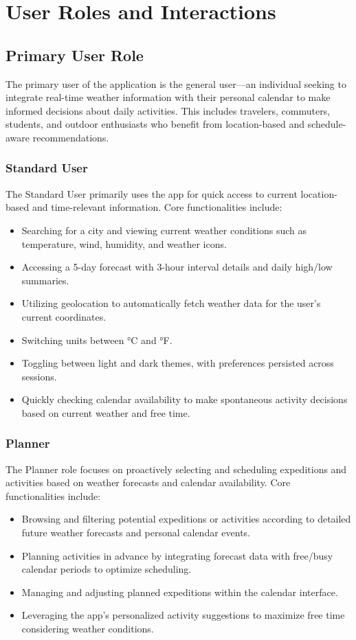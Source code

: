 \documentclass[fontsize=13pt,a4paper]{scrartcl}
\begin{document}
\newpage


\section{User Roles and Interactions}

\subsection{Primary User Role}
The primary user of the application is the general user—an individual seeking to integrate real-time weather information with their personal calendar to make informed decisions about daily activities. This includes travelers, commuters, students, and outdoor enthusiasts who benefit from location-based and schedule-aware recommendations.

\subsubsection*{\textbf{Standard User}}
The Standard User primarily uses the app for quick access to current location-based and time-relevant information. Core functionalities include:
\begin{itemize}[nosep]
  \item Searching for a city and viewing current weather conditions such as temperature, wind, humidity, and weather icons.
  \item Accessing a 5-day forecast with 3-hour interval details and daily high/low summaries.
  \item Utilizing geolocation to automatically fetch weather data for the user’s current coordinates.
  \item Switching units between °C and °F.
  \item Toggling between light and dark themes, with preferences persisted across sessions.
  \item Quickly checking calendar availability to make spontaneous activity decisions based on current weather and free time.
\end{itemize}

\subsubsection*{\textbf{Planner}}
The Planner role focuses on proactively selecting and scheduling expeditions and activities based on weather forecasts and calendar availability. Core functionalities include:
\begin{itemize}[nosep]
  \item Browsing and filtering potential expeditions or activities according to detailed future weather forecasts and personal calendar events.
  \item Planning activities in advance by integrating forecast data with free/busy calendar periods to optimize scheduling.
  \item Managing and adjusting planned expeditions within the calendar interface.
  \item Leveraging the app’s personalized activity suggestions to maximize free time considering weather conditions.
\end{itemize}
\end{document}
